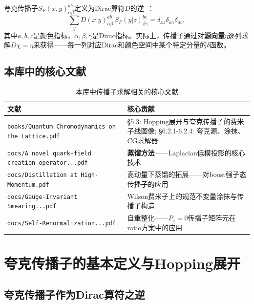 \documentclass[12pt,a4paper]{ctexart}
\theoremstyle{definition}
\begin{document}
夸克传播子$S_F(x, y)^{ab}_{\alpha\beta}$定义为Dirac算符$D$的逆~\cite{GattringerLang2010}：
\begin{equation}
\sum_{y} D(x|y)_{\alpha\beta}^{ab} \, S_F(y|z)_{\beta\gamma}^{bc} = \delta_{xz} \delta_{\alpha\gamma} \delta_{ac},
\label{eq:prop_inverse}
\end{equation}
其中$a,b,c$是颜色指标，$\alpha,\beta,\gamma$是Dirac指标。实际上，传播子通过对\textbf{源向量}$\eta$逐列求解$D \chi = \eta$来获得——每一列对应Dirac和颜色空间中某个特定分量的$\delta$函数。

\subsection{本库中的核心文献}

\begin{table}[H]
\centering
\caption{本库中传播子求解相关的核心文献}
\label{tab:prop_papers}
\small
\begin{tabular}{lp{9cm}}
\toprule
文献 & 核心贡献 \\
\midrule
\texttt{books/Quantum Chromodynamics on the Lattice.pdf}~\cite{GattringerLang2010} &
§5.3: Hopping展开与夸克传播子的费米子线图像; §6.2.1-6.2.4: 夸克源、涂抹、CG求解器 \\
\texttt{docs/A novel quark-field creation operator...pdf}~\cite{Distillation2009} & \textbf{蒸馏方法}——Laplacian低模投影的核心技术 \\
\texttt{docs/Distillation at High-Momentum.pdf} & 高动量下蒸馏的拓展——对boost强子态传播子的应用 \\
\texttt{docs/Gauge-Invariant Smearing...pdf} & Wilson费米子上的规范不变量涂抹与传播子构造 \\
\texttt{docs/Self-Renormalization...pdf}~\cite{Huo2021self} & 自重整化——$P_z=0$传播子矩阵元在ratio方案中的应用 \\
\bottomrule
\end{tabular}
\end{table}

\section{夸克传播子的基本定义与Hopping展开}

\subsection{夸克传播子作为Dirac算符之逆}
\end{document}
